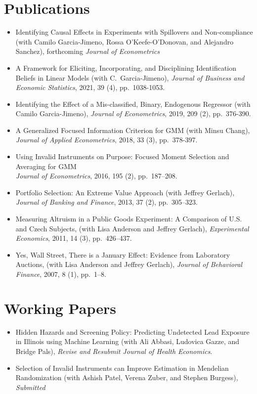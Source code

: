 \documentclass[line,overlapped]{myres}
\begin{document}
\begin{resume}
\section{\sc Publications}
\begin{itemize}
  \item Identifying Causal Effects in Experiments with Spillovers and Non-compliance (with Camilo Garcia-Jimeno, Rossa O'Keefe-O'Donovan, and Alejandro Sanchez), forthcoming \emph{Journal of Econometrics}
  \item A Framework for Eliciting, Incorporating, and Disciplining Identification Beliefs in Linear Models (with C.\ Garcia-Jimeno), \emph{Journal of Business and Economic Statistics}, 2021, 39 (4), pp.\ 1038-1053.
  \item Identifying the Effect of a Mis-classified, Binary, Endogenous Regressor (with Camilo Garcia-Jimeno), \emph{Journal of Econometrics}, 2019, 209 (2), pp.\ 376-390.
  \item A Generalized Focused Information Criterion for GMM (with Minsu Chang), \emph{Journal of Applied Econometrics}, 2018, 33 (3), pp.\ 378-397.
  \item Using Invalid Instruments on Purpose: Focused Moment Selection and Averaging for GMM\\ \emph{Journal of Econometrics}, 2016, 195 (2), pp.\ 187--208.
	\item Portfolio Selection: An Extreme Value Approach (with Jeffrey Gerlach), \emph{Journal of Banking and Finance}, 2013, 37 (2), pp.\ 305--323.
	\item Measuring Altruism in a Public Goods Experiment:  A Comparison of U.S. and Czech Subjects, (with Lisa Anderson and Jeffrey Gerlach), \emph{Experimental Economics}, 2011, 14 (3), pp.\ 426--437.
	\item Yes, Wall Street, There is a January Effect: Evidence from Laboratory Auctions, (with Lisa Anderson and Jeffrey Gerlach), \emph{Journal of Behavioral Finance}, 2007, 8 (1), pp.\ 1--8. 
\end{itemize}


\section{\sc Working Papers}
\begin{itemize}
  \item Hidden Hazards and Screening Policy: Predicting Undetected Lead Exposure in Illinois using Machine Learning (with Ali Abbasi, Ludovica Gazze, and Bridge Pals), \emph{Revise and Resubmit Journal of Health Economics}.
  \item Selection of Invalid Instruments can Improve Estimation in Mendelian Randomization (with Ashish Patel, Verena Zuber, and Stephen Burgess), \emph{Submitted}
\end{itemize}



\end{resume}
\end{document}
